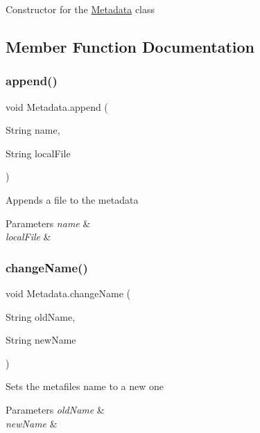 Constructor for the \mbox{\hyperlink{class_metadata}{Metadata}} class 

\subsection{Member Function Documentation}
\mbox{\label{class_metadata_a84c55073051d681405262f85feed7286}} 
\subsubsection{\texorpdfstring{append()}{append()}}
{\footnotesize\ttfamily void Metadata.\+append (\begin{DoxyParamCaption}\item[{String}]{name,  }\item[{String}]{local\+File }\end{DoxyParamCaption})\hspace{0.3cm}{\ttfamily [inline]}}

Appends a file to the metadata 
\begin{DoxyParams}{Parameters}
{\em name} & \\
\hline
{\em local\+File} & \\
\hline
\end{DoxyParams}
\mbox{\label{class_metadata_afba93e3d4b961ddcd67b5f2530a9e20d}} 
\subsubsection{\texorpdfstring{change\+Name()}{changeName()}}
{\footnotesize\ttfamily void Metadata.\+change\+Name (\begin{DoxyParamCaption}\item[{String}]{old\+Name,  }\item[{String}]{new\+Name }\end{DoxyParamCaption})\hspace{0.3cm}{\ttfamily [inline]}}

Sets the metafile\textquotesingle{}s name to a new one 
\begin{DoxyParams}{Parameters}
{\em old\+Name} & \\
\hline
{\em new\+Name} & \\
\hline
\end{DoxyParams}
\mbox{\label{class_metadata_a67800e2f003cabb15744b86bec38a783}} 
